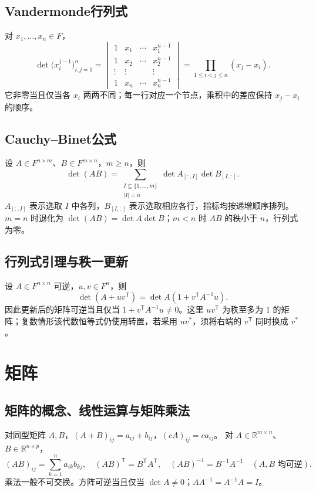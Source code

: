 \documentclass[../main.tex]{subfiles}
\begin{document}
\subsection{Vandermonde行列式}
对 $x_1,\ldots,x_n\in F$，
\[
\det\bigl(x_i^{j-1}\bigr)_{i,j=1}^n
=\begin{vmatrix}
1&x_1&\cdots&x_1^{n-1}\\
1&x_2&\cdots&x_2^{n-1}\\
\vdots&\vdots&&\vdots\\
1&x_n&\cdots&x_n^{n-1}
\end{vmatrix}
=\prod_{1\le i<j\le n}(x_j-x_i).
\]
它非零当且仅当各 $x_i$ 两两不同；每一行对应一个节点，乘积中的差应保持 $x_j-x_i$ 的顺序。
\par\pagebreak[0]\begin{samepage}
\subsection{Cauchy--Binet公式}
设 $A\in F^{n\times m}$、$B\in F^{m\times n}$，$m\ge n$，则
\[
\det(AB)=\sum_{\substack{I\subseteq\{1,\ldots,m\}\\|I|=n}}
\det A_{[:,I]}\det B_{[I,:]}.
\]
$A_{[:,I]}$ 表示选取 $I$ 中各列，$B_{[I,:]}$ 表示选取相应各行，指标均按递增顺序排列。$m=n$ 时退化为 $\det(AB)=\det A\det B$；$m<n$ 时 $AB$ 的秩小于 $n$，行列式为零。
\par\end{samepage}\pagebreak[0]
\subsection{行列式引理与秩一更新}
设 $A\in F^{n\times n}$ 可逆，$u,v\in F^n$，则
\[
\det(A+uv^{\mathsf T})=\det A\left(1+v^{\mathsf T}A^{-1}u\right).
\]
因此更新后的矩阵可逆当且仅当 $1+v^{\mathsf T}A^{-1}u\ne0$。这里 $uv^{\mathsf T}$ 为秩至多为 $1$ 的矩阵；复数情形该代数恒等式仍使用转置，若采用 $uv^*$，须将右端的 $v^{\mathsf T}$ 同时换成 $v^*$。
\section{矩阵}
\subsection{矩阵的概念、线性运算与矩阵乘法}
对同型矩阵 $A,B$，$(A+B)_{ij}=a_{ij}+b_{ij}$，$(cA)_{ij}=ca_{ij}$。
对 $A\in\mathbb R^{m\times n}$、$B\in\mathbb R^{n\times p}$，
\[
(AB)_{ij}=\sum_{k=1}^na_{ik}b_{kj},\quad (AB)^{\mathsf T}=B^{\mathsf T}A^{\mathsf T},\quad
(AB)^{-1}=B^{-1}A^{-1}\quad(A,B\text{ 均可逆}).
\]
乘法一般不可交换。方阵可逆当且仅当 $\det A\ne0$；$AA^{-1}=A^{-1}A=I$。
\end{document}
